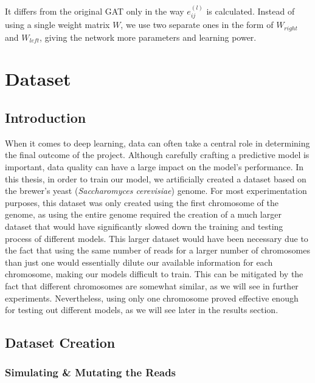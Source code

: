 \documentclass[times, utf8, diplomski, english]{fer_eng}
\begin{document}
It differs from the original GAT only in the way $e_{ij}^{(l)}$ is calculated. Instead of using a single weight matrix $W$, we use two separate ones in the form of $W_{right}$ and $W_{left}$, giving the network more parameters and learning power.

\chapter{Dataset}
\label{dataset}

\section{Introduction}

When it comes to deep learning, data can often take a central role in determining the final outcome of the project. Although carefully crafting a predictive model is important, data quality can have a large impact on the model's performance. In this thesis, in order to train our model, we artificially created a dataset based on the brewer's yeast (\textit{Saccharomyces cerevisiae}) genome. For most experimentation purposes, this dataset was only created using the first chromosome of the genome, as using the entire genome required the creation of a much larger dataset that would have significantly slowed down the training and testing process of different models. This larger dataset would have been necessary due to the fact that using the same number of reads for a larger number of chromosomes than just one would essentially dilute our available information for each chromosome, making our models difficult to train. This can be mitigated by the fact that different chromosomes are somewhat similar, as we will see in further experiments. Nevertheless, using only one chromosome proved effective enough for testing out different models, as we will see later in the results section.

\section{Dataset Creation}

\subsection{Simulating \& Mutating the Reads}
\end{document}
